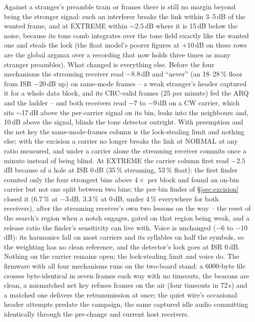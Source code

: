 Against a stranger's preamble train or frames there is still no
margin beyond being the stronger signal: such an interferer breaks the
link within 3--5\,dB of the wanted frame, and at EXTREME within
$\sim$2.5\,dB where it is 15\,dB below the noise, because its tone
comb integrates over the tone field exactly like the wanted one and
steals the lock (the float model's poorer figures at $+10$\,dB on these
rows are the global argmax over a recording that now holds three times
as many stranger preambles).  What changed is everything else.  Before
the four mechanisms the streaming receiver read $-8.8$\,dB and
``never'' (an 18--28\,\% floor from ISR $-20$\,dB up) on same-mode
frames -- a weak stranger's header captured it for a whole data block,
and its CRC-valid frames (25 per minute) fed the ARQ and the ladder --
and both receivers read $-7$ to $-9$\,dB on a CW carrier, which sits
$\sim$17\,dB above the per-carrier signal on its bin, leaks into the
neighbours and, 10\,dB above the signal, blinds the tone detector
outright.  With preemption and the net key the same-mode-frames column
is the lock-stealing limit and nothing else; with the excision a
carrier no longer breaks the link at NORMAL at any ratio measured, and
under a carrier alone the streaming receiver commits once a minute
instead of being blind.  At EXTREME the carrier column first read
$-2.5$\,dB because of a hole at ISR 0\,dB (35\,\% streaming, 53\,\%
float): the first finder counted only the four strongest bins above
$4\times$ per block and found an on-bin carrier but not one split
between two bins; the per-bin finder of \S\ref{sec:excision} closed it
(6.7\,\% at $-3$\,dB, 3.3\,\% at 0\,dB, under 4\,\% everywhere for
both receivers), after the streaming receiver's own two lessons on the
way -- the reset of the search's region when a notch engages, gated on
that region being weak, and a release ratio the finder's sensitivity
can live with.  Voice is unchanged
($-6$ to $-10$\,dB): its harmonics fall on most carriers and its
syllables on half the symbols, so the weighting has no clean reference,
and the detector's lock goes at ISR 0\,dB.  Nothing on the carrier
remains open; the lock-stealing limit and voice do.  The firmware with all four mechanisms runs on the
two-board stand: a 6000-byte file crosses byte-identical in seven frames
each way with no timeouts, the beacons are clean, a mismatched net key
refuses frames on the air (four timeouts in 72\,s) and a matched one
delivers the retransmission at once; the quiet wire's occasional header
attempts predate the campaign, the same captured idle audio committing
identically through the pre-change and current host receivers.


